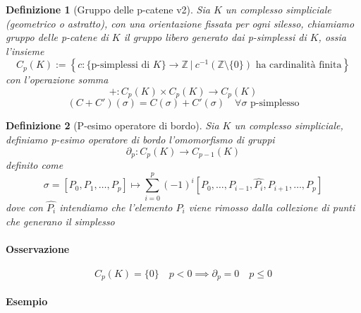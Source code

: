 \documentclass[a4paper]{report}
\newtheorem{definition}{Definizione}
\newcommand{\Z}{\ensuremath{\mathbb{Z}}}
\newcommand{\ra}{\ensuremath{\rightarrow}}
\newcommand{\setst}[2]{\ensuremath{\left\{{#1}\ |\ {#2}\right\}}}
\begin{document}
\begin{definition}[Gruppo delle p-catene v2]
    Sia $K$ un complesso simpliciale (geometrico o astratto), con una orientazione fissata per ogni silesso, chiamiamo gruppo delle p-catene di $K$ il gruppo libero generato dai p-simplessi di $K$, ossia l'insieme
    \[
        C_p(K):=\setst{c:\{\text{p-simplessi di }K\}\ra\Z}{c^{-1}(\Z\setminus\{0\})\text{ ha cardinalità finita}}
    \]
    con l'operazione somma
    \[
        +:C_p(K)\times C_p(K)\ra C_p(K)
    \]
    \[
        (C+C')(\sigma)=C(\sigma)+ C'(\sigma)\quad \forall\sigma\text{ p-simplesso}
    \]
\end{definition}
\begin{definition}[P-esimo operatore di bordo]
    Sia $K$ un complesso simpliciale, definiamo p-esimo operatore di bordo l'omomorfismo di gruppi
    \[
        \partial_p:C_p(K)\ra C_{p-1}(K)
    \]
    definito come
    \[
        \sigma=[P_0,P_1,\dots,P_p]\longmapsto\sum_{i=0}^p(-1)^i[P_0,\dots,P_{i-1},\hat{P_i},P_{i+1},\dots,P_p]
    \]
    dove con $\hat{P_i}$ intendiamo che l'elemento $P_i$ viene rimosso dalla collezione di punti che generano il simplesso
\end{definition}
\paragraph{Osservazione}
\[
    C_p(K)=\{0\}\quad p<0\implies \partial_p=0\quad p\leq 0
\]
\paragraph{Esempio}
\end{document}
